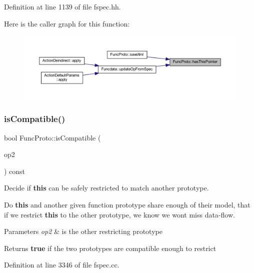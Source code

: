 Definition at line 1139 of file fspec.\+hh.

Here is the caller graph for this function\+:
\nopagebreak
\begin{figure}[H]
\begin{center}
\leavevmode
\includegraphics[width=350pt]{class_func_proto_a2a274b3ff58e50e73e4eaa82cb08bae3_icgraph}
\end{center}
\end{figure}
\mbox{\label{class_func_proto_aa5ee60788e6d8b4de304e2c5955a393b}} 
\subsubsection{\texorpdfstring{isCompatible()}{isCompatible()}}
{\footnotesize\ttfamily bool Func\+Proto\+::is\+Compatible (\begin{DoxyParamCaption}\item[{const \mbox{\hyperlink{class_func_proto}{Func\+Proto}} \&}]{op2 }\end{DoxyParamCaption}) const}



Decide if {\bfseries{this}} can be safely restricted to match another prototype. 

Do {\bfseries{this}} and another given function prototype share enough of their model, that if we restrict {\bfseries{this}} to the other prototype, we know we won\textquotesingle{}t miss data-\/flow. 
\begin{DoxyParams}{Parameters}
{\em op2} & is the other restricting prototype \\
\hline
\end{DoxyParams}
\begin{DoxyReturn}{Returns}
{\bfseries{true}} if the two prototypes are compatible enough to restrict 
\end{DoxyReturn}


Definition at line 3346 of file fspec.\+cc.


